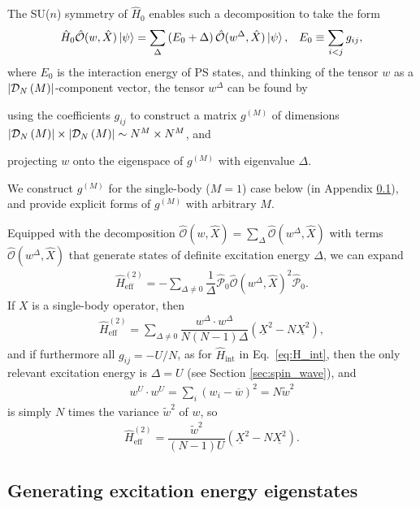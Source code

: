 \documentclass[aps,pra,nofootinbib,twocolumn,superscriptaddress]{revtex4-2}
\renewcommand{\t}{\text} %
\newcommand{\f}[2]{\dfrac{#1}{#2}} %
\newcommand{\p}[1]{\left(#1\right)} %
\newcommand{\1}{\mathds{1}}
\renewcommand{\H}{\hat{H}}
\renewcommand{\O}{\hat{\mathcal{O}}}
\renewcommand{\P}{\hat{\mathcal{P}}}
\newcommand{\D}{\mathcal{D}}
\newcommand{\col}{\underline}
\newcommand{\mean}{\overline}
\begin{document}
The SU($n$) symmetry of $\H_0$ enables such a decomposition to take the form
\begin{align}
  \H_0 \O(w,\hat{X}) \ket\psi
  = \sum_\Delta \p{E_0+\Delta} \O(w^\Delta,\hat{X}) \ket\psi,
  &&
  E_0 \equiv \sum_{i<j} g_{ij},
  \label{eq:excitation}
\end{align}
where $E_0$ is the interaction energy of PS states, and thinking of the tensor $w$ as a $\abs{\D_N\p{M}}$-component vector, the tensor $w^\Delta$ can be found by
\begin{enumerate*}
\item using the coefficients $g_{ij}$ to construct a matrix $g^{(M)}$ of dimensions $\abs{\D_N\p{M}}\times\abs{\D_N\p{M}}\sim N^M\times N^M$, and
\item projecting $w$ onto the eigenspace of $g^{(M)}$ with eigenvalue $\Delta$.
\end{enumerate*}
We construct $g^{(M)}$ for the single-body ($M=1$) case below (in Appendix \ref{sec:eigenstates}), and provide explicit forms of $g^{(M)}$ with arbitrary $M$.

Equipped with the decomposition $\O(w,\hat{X})=\sum_\Delta\O(w^\Delta,\hat{X})$ with terms $\O(w^\Delta,\hat{X})$ that generate states of definite excitation energy $\Delta$, we can expand
\begin{align}
  \H_{\t{eff}}^{(2)} = -\sum_{\Delta\ne0} \f1\Delta
  \P_0 \O(w^\Delta,\hat{X})^2 \P_0.
\end{align}
If $X$ is a single-body operator, then
\begin{align}
  \H_{\t{eff}}^{(2)}
  = \sum_{\Delta\ne0} \f{w^\Delta\cdot w^\Delta}{N\p{N-1}\Delta}
  \p{\col{X}^2 - N \col{X^2}},
\end{align}
and if furthermore all $g_{ij}=-U/N$, as for $\H_{\t{int}}$ in Eq.~\eqref{eq:H_int}, then the only relevant excitation energy is $\Delta=U$ (see Section \ref{sec:spin_wave}), and
\begin{align}
  w^U\cdot w^U = \sum_i \p{w_i-\mean w}^2 = N \widetilde{w}^2
\end{align}
is simply $N$ times the variance $\widetilde{w}^2$ of $w$, so
\begin{align}
  \H_{\t{eff}}^{(2)}
  = \f{\widetilde{w}^2}{\p{N-1}U} \p{\col{X}^2 - N \col{X^2}}.
\end{align}

\subsection{Generating excitation energy eigenstates}
\label{sec:eigenstates}
\end{document}
